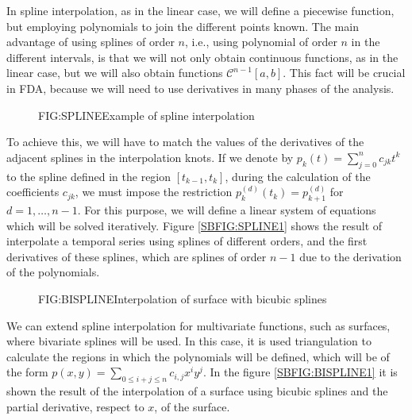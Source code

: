 
In spline interpolation\cite{Boor1981}, as in the linear case, we will define a piecewise
function, but employing polynomials to join the different points known.
The main advantage of using splines of order $n$, i.e., using polynomial of
order $n$ in the different intervals, is that we will not only obtain continuous
functions, as in the linear case, but we will also obtain functions
$\mathcal{C}^{n-1}[a,b]$. This fact will be crucial in FDA, because we will need
to use derivatives in many phases of the analysis.

\begin{figure}[Example of spline interpolation]{FIG:SPLINE}{Example of spline interpolation}
	 \quad
\end{figure}

To achieve this, we will have to match the values of the derivatives of the
adjacent splines in the interpolation knots. If we denote by
$p_k(t)=\sum_{j=0}^n c_{jk} t^k$ to the spline defined in the region
$[t_{k-1}, t_{k}]$, during the calculation of the coefficients $c_{jk}$, we must
impose the restriction $p_{k}^{(d)}(t_k) = p_{k+1}^{(d)}$ for \\ $d=1, \dots, n-1$.
For this purpose, we will define a linear system of equations which will be
solved iteratively. Figure \ref{SBFIG:SPLINE1} shows the result of interpolate a
temporal series using splines of different orders, and the first derivatives of
these splines, which are splines of order $n-1$ due to the derivation of the
polynomials.

\begin{figure}[Interpolation of surface]{FIG:BISPLINE}{Interpolation of surface with bicubic splines}
	 \quad
\end{figure}

We can extend spline interpolation for multivariate functions, such as surfaces,
where bivariate splines will be used. In this case, it is used triangulation
to calculate the regions in which the polynomials will be defined, which will
be of the form $p(x, y) = \sum_{0 \le i + j \le n} c_{i,j}x^i y^j$.
In the figure \ref{SBFIG:BISPLINE1} it is shown the result of the
interpolation of a surface using bicubic splines and the partial derivative,
respect to $x$, of the surface.
